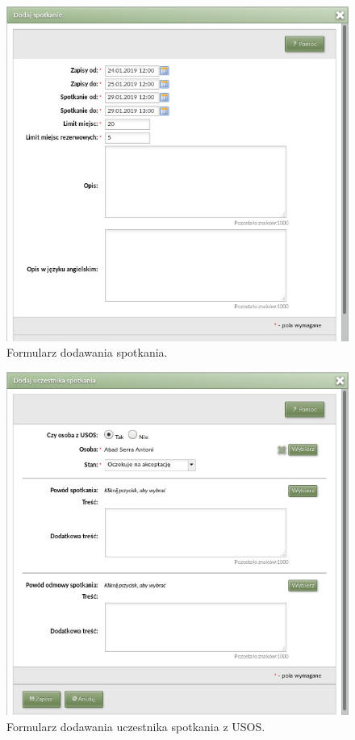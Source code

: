 \documentclass[licencjacka]{pracamgr}
\begin{document}
\begin{figure}[!]
  \includegraphics[width=\linewidth]{formularz_spotkan.jpg}
  \caption{Formularz dodawania spotkania.}
  \label{fig:kalenformspotkadm}
\end{figure}

\begin{figure}[!]
  \includegraphics[width=\linewidth]{formularz_uczestnikow_USOS.jpg}
  \caption{Formularz dodawania uczestnika spotkania z USOS.}
  \label{fig:kalenformuczusosadm}
\end{figure}
\end{document}
